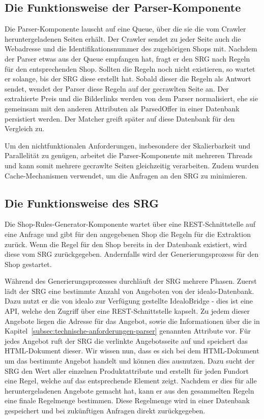 \subsection{Die Funktionsweise der Parser-Komponente}
\label{subsec:funktionsweise-parser}

Die Parser-Komponente lauscht auf eine Queue, über die sie die vom Crawler heruntergeladenen Seiten erhält.
Der Crawler sendet zu jeder Seite auch die Webadresse und die Identifikationsnummer des zugehörigen Shops mit.
Nachdem der Parser etwas aus der Queue empfangen hat, fragt er den SRG nach Regeln für den entsprechenden Shop.
Sollten die Regeln noch nicht existieren, so wartet er solange, bis der SRG diese erstellt hat.
Sobald dieser die Regeln als Antwort sendet, wendet der Parser diese Regeln auf der gecrawlten Seite an.
Der extrahierte Preis und die Bilderlinks werden von dem Parser normalisiert, ehe sie gemeinsam mit den anderen
Attributen als ParsedOffer in einer Datenbank persistiert werden.
Der Matcher greift später auf diese Datenbank für den Vergleich zu.

Um den nichtfunktionalen Anforderungen, insbesondere der Skalierbarkeit und Parallelität zu genügen, arbeitet die
Parser-Komponente mit mehreren Threads und kann somit mehrere gecrawlte Seiten gleichzeitig verarbeiten.
Zudem wurden Cache-Mechanismen verwendet, um die Anfragen an den SRG zu minimieren.


\subsection{Die Funktionsweise des SRG}
\label{subsec:funktionsweise-srg}

Die Shop-Rules-Generator-Komponente wartet über eine REST-Schnittstelle auf eine Anfrage und gibt für den angegebenen
Shop die Regeln für die Extraktion zurück.
Wenn die Regel für den Shop bereits in der Datenbank existiert, wird diese vom SRG zurückgegeben.
Andernfalls wird der Generierungsprozess für den Shop gestartet.

Während des Generierungsprozesses durchläuft der SRG mehrere Phasen.
Zuerst lädt der SRG eine bestimmte Anzahl von Angeboten von der idealo-Datenbank.
Dazu nutzt er die von idealo zur Verfügung gestellte IdealoBridge - dies ist eine API, welche den Zugriff über
eine REST-Schnittstelle kapselt.
Zu jedem dieser Angebote liegen die Adresse für das Angebot, sowie die  Informationen über die in
Kapitel~\ref{subsec:technische-anforderungen-parser} genannten Attribute vor.
Für jedes Angebot ruft der SRG die verlinkte Angebotsseite auf und speichert das HTML-Dokument dieser.
Wir wissen nun, dass es sich bei dem HTML-Dokument um das bestimmte Angebot handelt und können dies ausnutzen.
Dazu sucht der SRG den Wert aller einzelnen Produktattribute und erstellt für jeden Fundort eine Regel, welche auf
das entsprechende Element zeigt.
Nachdem er dies für alle heruntergeladenen Angebote gemacht hat, kann er aus den gesammelten Regeln eine
finale Regelmenge bestimmen.
Diese Regelmenge wird in einer Datenbank gespeichert und bei zukünftigen Anfragen direkt zurückgegeben.